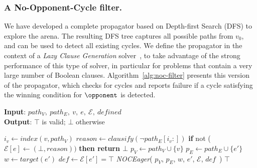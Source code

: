 \documentclass[runningheads]{llncs}
\begin{document}
\subsubsection{A No-Opponent-Cycle filter.} \label{sec:nocfilter}
We have developed a complete propagator based on Depth-first Search (DFS) to explore the arena. The resulting DFS tree captures all possible paths from $v_0$, and can be used to detect all existing cycles. We define the propagator in the context of a \textit{Lazy Clause Generation} solver~\cite{DBLP:journals/constraints/OhrimenkoSC09}, to take advantage of the strong performance of this type of solver, in particular for problems that contain a very large number of Boolean clauses. Algorithm~\ref{alg:noc-filter} presents this version of the propagator, which checks for cycles and reports failure if a cycle 
satisfying the winning condition for 
$\opponent$ is detected.

\begin{algorithm}[htb]
\small
\caption{\textbf{\textit{NOCFilter}}}
\textbf{Input}: $path_V,\ path_E,\ v,\ e,\ \mathcal{E},\ \textit{defined}$ \\
\textbf{Output}: $\top$ is valid; $\bot$ otherwise
\begin{algorithmic}[1]
     \label{alg:noc-filter:pathcheck}
        \STATE $i_v \gets \textit{index}(v, path_V)$
        \IF{$\neg \gamma_{\player}$} \label{alg:noc-filter:condition}
            \STATE $\textit{reason} \gets \textit{clausify}(\neg path_E[i_v:])$ \label{alg:noc-eager:reason}
            \STATE \textbf{if }not ($\mathcal{E}[e] \gets (\bot, \textit{reason}))$ \textbf{then return $\bot$} \label{alg:noc-eager:ruleoutedge}
        \ENDIF
     \label{alg:noc-eager:defcheck}
         \label{alg:no-opponent-cycle-f1:edgecheck}
            \STATE $p_V \gets path_V \cup \{v\}$
            \STATE $p_E \gets path_E \cup \{e'\}$
            \STATE $w \gets \textit{target}(e')$
            \STATE $\textit{def} \gets \mathcal{E}[e'] = \top$
            \STATE \textit{NOCEager}(
                $p_V$,
                $p_E$,
                $w$,
                $e'$,
                $\mathcal{E}$,
                $\textit{def}$\ )
        \ENDFOR
    \ENDIF
    \RETURN $\top$
\end{algorithmic}
\label{alg:noc-filter}
\end{algorithm}
\end{document}
